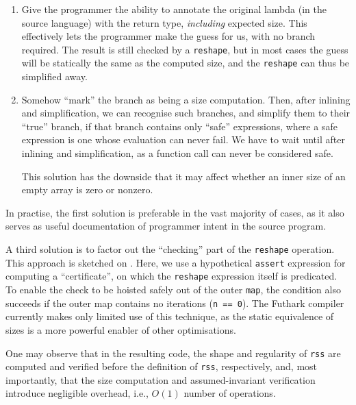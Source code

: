 \begin{enumerate}
\item Give the programmer the ability to annotate the original lambda
  (in the source language) with the return type, \textit{including}
  expected size.  This effectively lets the programmer make the guess
  for us, with no branch required.  The result is still checked by a
  \lstinline{reshape}, but in most cases the guess will be statically
  the same as the computed size, and the \lstinline{reshape} can thus
  be simplified away.
\item Somehow ``mark'' the branch as being a size computation.  Then,
  after inlining and simplification, we can recognise such branches,
  and simplify them to their ``true'' branch, if that branch contains
  only ``safe'' expressions, where a safe expression is one whose
  evaluation can never fail.  We have to wait until after inlining and
  simplification, as a function call can never be considered safe.

  This solution has the downside that it may affect whether an inner
  size of an empty array is zero or nonzero.
\end{enumerate}

In practise, the first solution is preferable in the vast majority of
cases, as it also serves as useful documentation of programmer intent
in the source program.

A third solution is to factor out the ``checking'' part of the
\lstinline{reshape} operation.  This approach is sketched on
.  Here, we use a hypothetical
\lstinline{assert} expression for computing a ``certificate'', on
which the \lstinline{reshape} expression itself is predicated.  To
enable the check to be hoisted safely out of the outer
\lstinline{map}, the condition also succeeds if the outer map contains
no iterations (\lstinline{n == 0}).  The Futhark compiler currently
makes only limited use of this technique, as the static equivalence of
sizes is a more powerful enabler of other optimisations.

One may observe that in the resulting code, the shape and regularity
of \texttt{rss} are computed and verified before the definition of
\texttt{rss}, respectively, and, most importantly, that the size
computation and assumed-invariant verification introduce negligible
overhead, i.e., $O(1)$ number of operations.

